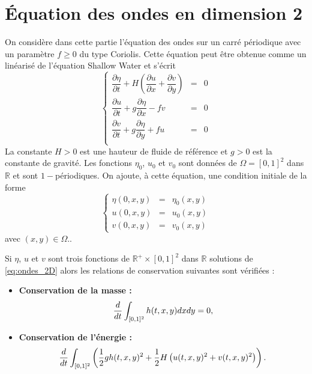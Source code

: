\section{Équation des ondes en dimension 2}

On considère dans cette partie l'équation des ondes sur un carré périodique avec un paramètre $f \geq 0$ du type Coriolis. Cette équation peut être obtenue comme un linéarisé de l'équation Shallow Water et s'écrit 
\begin{equation}
\left\lbrace
\begin{array}{rcl}
\dfrac{\partial \eta}{\partial t} + H \left( \dfrac{\partial u}{\partial x} + \dfrac{\partial v}{\partial y} \right) & = & 0 \\
\dfrac{\partial u}{\partial t} + g \dfrac{\partial \eta}{\partial x} - f v & = & 0 \\
\dfrac{\partial v}{\partial t} + g \dfrac{\partial \eta}{\partial y} + f u & = & 0 \\
\end{array}
\right.
\label{eq:ondes_2D}
\end{equation}
La constante $H>0$ est une hauteur de fluide de référence et $g>0$ est la constante de gravité.
Les fonctions $\eta_0$, $u_0$ et $v_0$ sont données de $\Omega = [0,1]^2$ dans $\mathbb{R}$ et sont $1-$périodiques. On ajoute, à cette équation, une condition initiale de la forme
\begin{equation}
\left\lbrace
\begin{array}{rcl}
\eta(0,x,y) & = & \eta_0(x,y)\\
u(0,x,y) & = & u_0(x,y)\\
v(0,x,y) & = & v_0(x,y)
\end{array}
\right.
\end{equation}
avec $(x,y) \in \Omega.$. 

\begin{proposition}
Si $\eta$, $u$ et $v$ sont trois fonctions de $\mathbb{R}^+ \times [0,1]^2$ dans $\mathbb{R}$ solutions de \eqref{eq:ondes_2D} alors les relations de conservation suivantes sont vérifiées :
\begin{itemize}
\item \textbf{Conservation de la masse :}
\begin{equation}
\dfrac{d}{dt} \displaystyle\int_{[0,1]^2} h(t,x,y)dxdy = 0,
\end{equation}
\item \textbf{Conservation de l'énergie :}
\begin{equation}
\dfrac{d}{dt} \displaystyle\int_{[0,1]^2} \left( \dfrac{1}{2} g h(t,x,y)^2 + \dfrac{1}{2} H \left( u(t,x,y)^2 + v(t,x,y)^2 \right) \right).
\end{equation}
\end{itemize}
\end{proposition}

